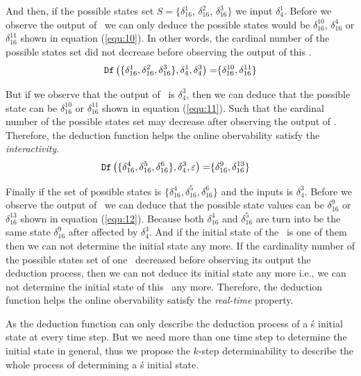 And then, if the possible states set $S=\{\delta_{16}^1$, $\delta_{16}^2$, $\delta_{16}^3\}$ we input $\delta_4^1$. Before we observe the output of \BCN\ we can only deduce the possible states would be $\delta_{16}^{10}$, $\delta_{16}^4$ or  $\delta_{16}^{11}$ shown in equation (\ref{equ:10}). In other words, the cardinal number of the possible states set did not decrease before observing the output of this \BCN.
\begin{equation}
\begin{split}
{\tt Df}\left(\{\delta_{16}^1,\delta_{16}^2,\delta_{16}^3\},\delta_4^1,\delta_4^3\right)=&\{\delta_{16}^{10},\delta_{16}^{11}\}\\
\end{split}
\label{equ:11}
\end{equation}

But if we observe that the output of \BCN\ is $\delta_4^3$, then we can deduce that the possible state can be $\delta_{16}^{10}$ or  $\delta_{16}^{11}$ shown in equation (\ref{equ:11}). Such that the cardinal number of the possible states set may decrease after observing the output of \BCN. Therefore, the deduction function helps the online obervability satisfy the {\em interactivity}.
\begin{equation}
\begin{split}
{\tt Df}\left(\{\delta_{16}^4,\delta_{16}^5,\delta_{16}^6\},\delta_4^3,\varepsilon\right)=&\{\delta_{16}^9,\delta_{16}^{13}\}
\end{split}
\label{equ:12}
\end{equation}

 Finally if the set of possible states is $\{\delta_{16}^4,\delta_{16}^5,\delta_{16}^6\}$ and the inputs is $\delta_4^3$. Before we observe the output of \BCN\ we can deduce that the possible state values can be $\delta_{16}^9$ or $\delta_{16}^{13}$ shown in equation (\ref{equ:12}). Because both $\delta_{16}^4$ and $\delta_{16}^5$ are turn into be the same state $\delta_{16}^9$ after affected by $\delta_4^3$. And if the initial state of the \BCN\ is one of them then we can not determine the initial state any more. If the cardinality number of the possible states set of one \BCN\ decreased before observing its output the deduction process, then we can not deduce its initial state any more i.e., we can not determine the initial state of this \BCN\ any more. Therefore, the deduction function helps the online obervability satisfy the {\em real-time} property. 

As the deduction function can only describe the deduction process of a \BCN\'s initial state at every time step. But we need more than one time step to determine the initial state in general, thus we propose the $k$-step determinability to describe the whole process of determining a \BCN\'s initial state.
